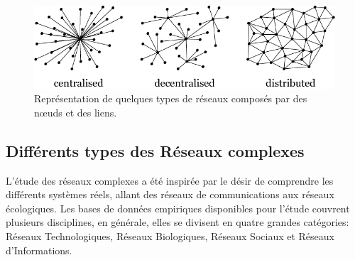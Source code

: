   \begin{figure}[h!]
  	\centering
  	\includegraphics[scale=0.55]{./figures/types-networks2}
  	\caption{Représentation de quelques types de réseaux composés par des nœuds et des liens. }
  	\label{exemples-reseaux}
  \end{figure}
 \subsection{Différents types des Réseaux complexes}
  L'étude des réseaux complexes a été inspirée par le désir de comprendre les différents systèmes réels, allant 
  des réseaux de communications aux réseaux écologiques. Les bases de données empiriques disponibles pour l'étude
  couvrent plusieurs disciplines, en générale, elles se divisent en quatre grandes catégories: Réseaux Technologiques,
  Réseaux Biologiques, Réseaux Sociaux et Réseaux d'Informations.
